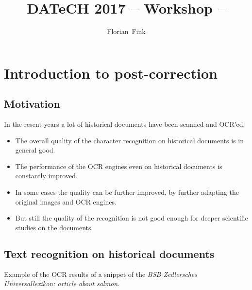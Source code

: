 
\title{DATeCH 2017 -- \pocoto{} Workshop -- \pocoto{}}
\author{Florian~Fink}



\begin{frame}
	\titlepage
\end{frame}

\section{Introduction to post-correction}
\subsection{Motivation}
\begin{frame}
	In the resent years a lot of historical documents have been
	scanned and OCR'ed.

	\begin{itemize}
		\item The overall quality of the character recognition on historical
			documents is in general good.
		\item The performance of the OCR engines even on historical documents is
			constantly improved.
		\item In some cases the quality can be further improved, by further
			adapting the original images and OCR engines.
		\item But still the quality of the recognition is not good enough for
			deeper scientific studies on the documents.
	\end{itemize}
\end{frame}


\subsection{Text recognition on historical documents}
\begin{frame}
	Example of the OCR results of a snippet of the \emph{BSB Zedlersches
	Universallexikon: article about salmon.}
\end{frame}

